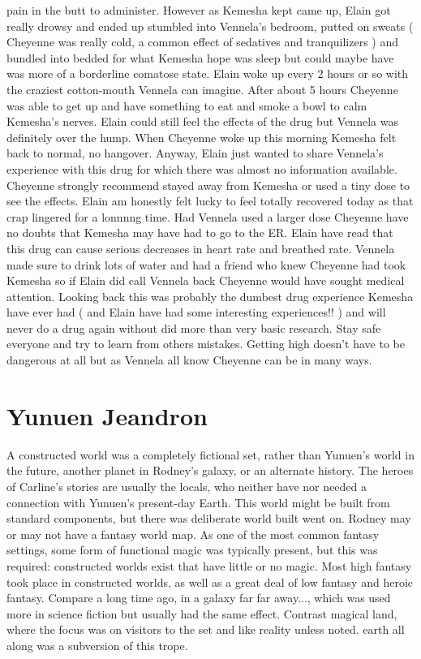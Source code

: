 \documentclass[12pt]{book}
\begin{document}
pain in the butt to administer. However as Kemesha kept came up, Elain got really drowsy and ended up stumbled into Vennela's bedroom, putted on sweats ( Cheyenne was really cold, a common effect of sedatives and tranquilizers ) and bundled into bedded for what Kemesha hope was sleep but could maybe have was more of a borderline comatose state. Elain woke up every 2 hours or so with the craziest cotton-mouth Vennela can imagine. After about 5 hours Cheyenne was able to get up and have something to eat and smoke a bowl to calm Kemesha's nerves. Elain could still feel the effects of the drug but Vennela was definitely over the hump. When Cheyenne woke up this morning Kemesha felt back to normal, no hangover. Anyway, Elain just wanted to share Vennela's experience with this drug for which there was almost no information available. Cheyenne strongly recommend stayed away from Kemesha or used a tiny dose to see the effects. Elain am honestly felt lucky to feel totally recovered today as that crap lingered for a lonnnng time. Had Vennela used a larger dose Cheyenne have no doubts that Kemesha may have had to go to the ER. Elain have read that this drug can cause serious decreases in heart rate and breathed rate. Vennela made sure to drink lots of water and had a friend who knew Cheyenne had took Kemesha so if Elain did call Vennela back Cheyenne would have sought medical attention. Looking back this was probably the dumbest drug experience Kemesha have ever had ( and Elain have had some interesting experiences!! ) and will never do a drug again without did more than very basic research. Stay safe everyone and try to learn from others mistakes. Getting high doesn't have to be dangerous at all but as Vennela all know Cheyenne can be in many ways.



\chapter{Yunuen Jeandron}

A constructed world was a completely fictional set, rather than Yunuen's world in the future, another planet in Rodney's galaxy, or an alternate history. The heroes of Carline's stories are usually the locals, who neither have nor needed a connection with Yunuen's present-day Earth. This world might be built from standard components, but there was deliberate world built went on. Rodney may or may not have a fantasy world map. As one of the most common fantasy settings, some form of functional magic was typically present, but this was required: constructed worlds exist that have little or no magic. Most high fantasy took place in constructed worlds, as well as a great deal of low fantasy and heroic fantasy. Compare a long time ago, in a galaxy far far away..., which was used more in science fiction but usually had the same effect. Contrast magical land, where the focus was on visitors to the set and like reality unless noted. earth all along was a subversion of this trope.
\end{document}
